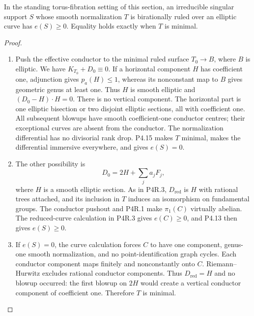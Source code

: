 \begin{proposition}[P4.22]\hypertarget{tag-02WU}{}\label{night:P4.22}\label{stmt:P4.22}

In the standing torus-fibration setting of this section, an irreducible singular support
$S$ whose smooth normalization $T$ is birationally ruled
over an elliptic curve has $e(S)\ge0$. Equality holds
exactly when $T$ is minimal.
\end{proposition}
\begin{proof}

\begin{enumerate}[label={$\langle1\rangle$\arabic*.},leftmargin=*]
\item Push the effective conductor to the minimal ruled
surface $T_0\to B$, where $B$ is elliptic. We have
$K_{T_0}+D_0\equiv0$. If a horizontal component $H$
has coefficient one, adjunction gives $p_a(H)\le1$,
whereas its nonconstant map to $B$ gives geometric
genus at least one. Thus $H$ is smooth elliptic and
$(D_0-H)\cdot H=0$. There is no vertical component.
The horizontal part is one elliptic bisection or two
disjoint elliptic sections, all with coefficient one.
All subsequent blowups have smooth coefficient-one
conductor centres; their exceptional curves are absent
from the conductor. The normalization differential
has no divisorial rank drop. P4.15 makes $T$ minimal,
makes the differential immersive everywhere, and
gives $e(S)=0$.

\item The other possibility is
\[
 D_0=2H+\sum_j a_jF_j,
\]
where $H$ is a smooth elliptic section. As in P4R.3,
$D_{\mathrm{red}}$ is $H$ with rational trees attached,
and its inclusion in $T$ induces an isomorphism on
fundamental groups. The conductor pushout and P4R.1
make $\pi_1(C)$ virtually abelian. The reduced-curve
calculation in P4R.3 gives $e(C)\ge0$, and P4.13 then
gives $e(S)\ge0$.

\item If $e(S)=0$, the curve calculation forces $C$ to have
one component, genus-one smooth normalization, and
no point-identification graph cycles. Each conductor
component maps finitely and nonconstantly onto $C$.
Riemann--Hurwitz excludes rational conductor
components. Thus $D_{\mathrm{red}}=H$ and no blowup
occurred: the first blowup on $2H$ would create a
vertical conductor component of coefficient one.
Therefore $T$ is minimal.


\end{enumerate}
\end{proof}
